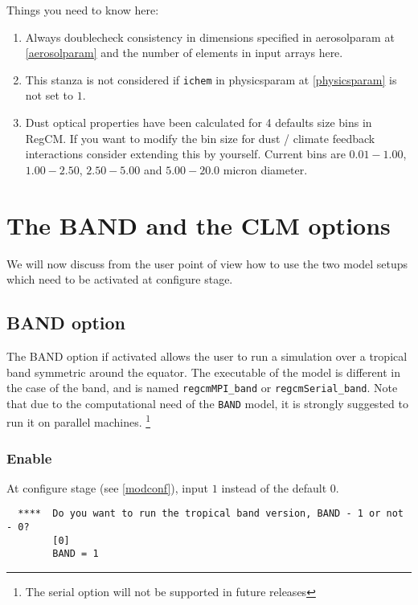 Things you need to know here:

\begin{enumerate}
\item Always doublecheck consistency in dimensions specified in aerosolparam at
\ref{aerosolparam} and the number of elements in input arrays here.
\item This stanza is not considered if \verb=ichem= in physicsparam at
\ref{physicsparam} is not set to $1$.
\item Dust optical properties have been calculated for 4 defaults size bins
in RegCM. If you want to modify the bin size for dust / climate feedback
interactions consider extending this by yourself. Current bins are $0.01-1.00$,
$1.00-2.50$, $2.50-5.00$ and $5.00-20.0$ micron diameter.
\end{enumerate}

\section{The BAND and the CLM options}

We will now discuss from the user point of view how to use the two model
setups which need to be activated at configure stage.

\subsection{BAND option}

The BAND option if activated allows the user to run a simulation over a tropical
band symmetric around the equator. The executable of the model is different
in the case of the band, and is named \verb=regcmMPI_band= or
\verb=regcmSerial_band=. Note that due to the computational need of the
\verb=BAND= model, it is strongly suggested to run it on parallel machines.
\footnote{The serial option will not be supported in future releases}

\subsubsection{Enable}

At configure stage (see \ref{modconf}), input $1$ instead of the default $0$.

\begin{Verbatim}
  ****  Do you want to run the tropical band version, BAND - 1 or not - 0?
        [0]
        BAND = 1
\end{Verbatim}

